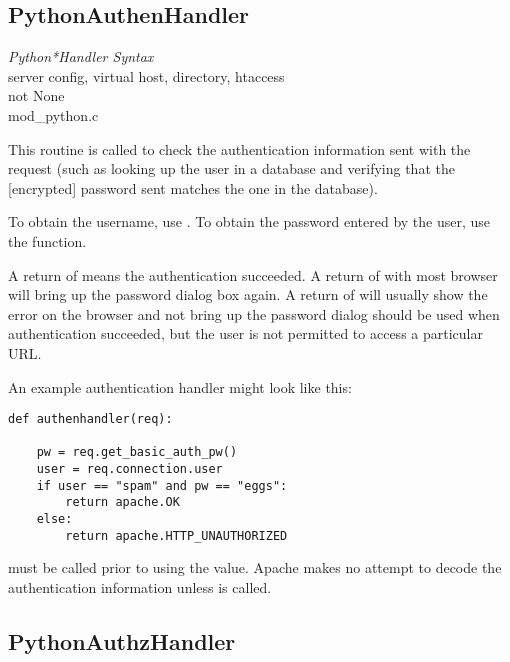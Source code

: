\subsection{PythonAuthenHandler\label{dir-handlers-auh}}

\emph{Python*Handler Syntax}\\
server config, virtual host, directory, htaccess\\
not None\\
mod_python.c

This routine is called to check the authentication information sent
with the request (such as looking up the user in a database and
verifying that the [encrypted] password sent matches the one in the
database).

To obtain the username, use . To obtain the
password entered by the user, use the 
function.

A return of  means the authentication succeeded. A
return of  with most browser will bring
up the password dialog box again. A return of
 will usually show the error on the
browser and not bring up the password dialog
 should be used when authentication
succeeded, but the user is not permitted to access a particular URL.

An example authentication handler might look like this: 

\begin{verbatim}
def authenhandler(req):

    pw = req.get_basic_auth_pw()
    user = req.connection.user     
    if user == "spam" and pw == "eggs":
        return apache.OK
    else:
        return apache.HTTP_UNAUTHORIZED
\end{verbatim}    

  must be called prior to using the
 value. Apache makes no attempt to decode the
authentication information unless  is called.

\subsection{PythonAuthzHandler\label{dir-handlers-auh}}

